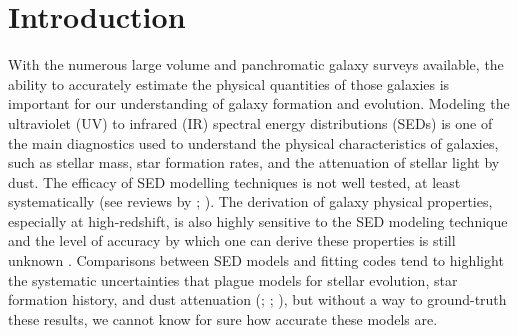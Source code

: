 \documentclass[twocolumn]{aastex62}
\begin{document}

\section{Introduction} \label{sec:intro}

With the numerous large volume and panchromatic galaxy surveys available, the ability to accurately estimate the physical quantities of those galaxies is important for our understanding of galaxy formation and evolution. Modeling the ultraviolet (UV) to infrared (IR) spectral energy distributions (SEDs) is one of the main diagnostics used to understand the physical characteristics of galaxies, such as stellar mass, star formation rates, and the attenuation of stellar light by dust. The efficacy of SED modelling techniques is not well tested, at least systematically (see reviews by \cite{conroy_modeling_2013}; \cite{walcher_fitting_2011}). The derivation of galaxy physical properties, especially at high-redshift, is also highly sensitive to the SED modeling technique and the level of accuracy by which one can derive these properties is still unknown \citep{hayward_should_2015}. Comparisons between SED models and fitting codes tend to highlight the systematic uncertainties that plague models for stellar evolution, star formation history, and dust attenuation (\cite{hunt_comprehensive_2019}; \cite{mitchell_how_2013}; \cite{pforr_recovering_2012}), but without a way to ground-truth these results, we cannot know for sure how accurate these models are. 
\end{document}

